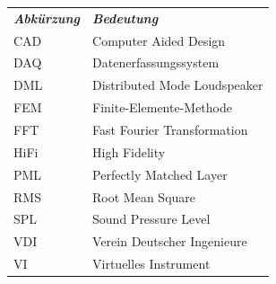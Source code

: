 \begin{table}[!h]
\setlength{\tabcolsep}{50pt}
	\centering
		\begin{tabular}[t]{l l}
\bfseries \emph{Abk\"urzung}& \bfseries \emph{Bedeutung}\\
		CAD	& Computer Aided Design\\
		DAQ	& Datenerfassungssystem\\
		DML	& Distributed Mode Loudspeaker\\
		FEM	& Finite-Elemente-Methode\\
		FFT	& Fast Fourier Transformation\\
		HiFi	& High Fidelity\\
		PML	& Perfectly Matched Layer\\
		RMS	& Root Mean Square\\
		SPL	& Sound Pressure Level\\
		VDI	& Verein Deutscher Ingenieure\\
		VI	& Virtuelles Instrument\\

		\end{tabular}

\end{table}
\normalsize
\normalfont
